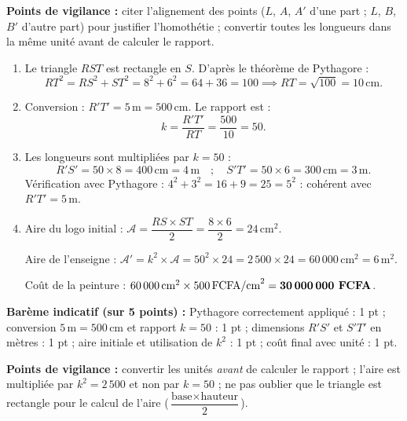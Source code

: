 \documentclass[11pt]{article}
\begin{document}
\begin{corrige}
\textbf{Points de vigilance :} citer l'alignement des points ($L$, $A$, $A'$ d'une part ; $L$, $B$, $B'$ d'autre part) pour justifier l'homothétie ; convertir toutes les longueurs dans la même unité avant de calculer le rapport.
\end{corrige}

\begin{corrige}
\begin{enumerate}
\item Le triangle $RST$ est rectangle en $S$. D'après le théorème de Pythagore :
\[RT^2 = RS^2 + ST^2 = 8^2 + 6^2 = 64 + 36 = 100 \implies RT = \sqrt{100} = 10\,\text{cm}.\]
\item Conversion : $R'T' = 5\,\text{m} = 500\,\text{cm}$. Le rapport est :
\[k = \dfrac{R'T'}{RT} = \dfrac{500}{10} = 50.\]
\item Les longueurs sont multipliées par $k = 50$ :
\[R'S' = 50 \times 8 = 400\,\text{cm} = 4\,\text{m} \quad ; \quad S'T' = 50 \times 6 = 300\,\text{cm} = 3\,\text{m}.\]
Vérification avec Pythagore : $4^2 + 3^2 = 16 + 9 = 25 = 5^2$ : cohérent avec $R'T' = 5\,\text{m}$.
\item Aire du logo initial : $\mathcal{A} = \dfrac{RS \times ST}{2} = \dfrac{8 \times 6}{2} = 24\,\text{cm}^2$.

Aire de l'enseigne : $\mathcal{A}' = k^2 \times \mathcal{A} = 50^2 \times 24 = 2\,500 \times 24 = 60\,000\,\text{cm}^2 = 6\,\text{m}^2$.

Coût de la peinture : $60\,000\,\text{cm}^2 \times 500\,\text{FCFA/cm}^2 = \textbf{30\,000\,000 FCFA}$.
\end{enumerate}
\textbf{Barème indicatif (sur 5 points) :} Pythagore correctement appliqué : 1 pt ; conversion $5\,\text{m} = 500\,\text{cm}$ et rapport $k = 50$ : 1 pt ; dimensions $R'S'$ et $S'T'$ en mètres : 1 pt ; aire initiale et utilisation de $k^2$ : 1 pt ; coût final avec unité : 1 pt.

\textbf{Points de vigilance :} convertir les unités \emph{avant} de calculer le rapport ; l'aire est multipliée par $k^2 = 2\,500$ et non par $k = 50$ ; ne pas oublier que le triangle est rectangle pour le calcul de l'aire ($\dfrac{\text{base} \times \text{hauteur}}{2}$).
\end{corrige}
\end{document}
